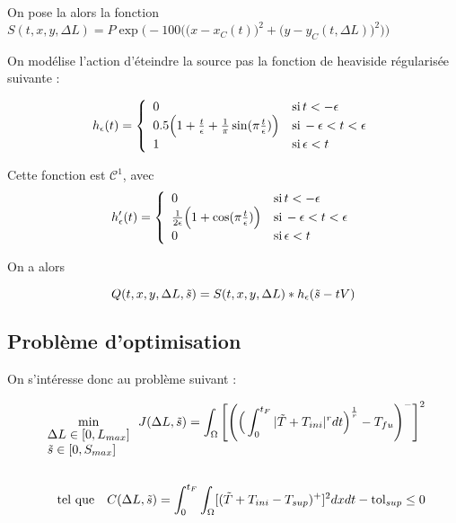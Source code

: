 \documentclass[11pt,a4paper]{article}
\begin{document}
On pose la alors la fonction $S(t,x,y,\Delta L)=P\exp\bigg(-100\Big(\big(x-x_C(t)\big)^2+\big(y-y_C(t,\Delta L)\big)^2\Big)\bigg)$
  
  On modélise l'action d'éteindre la source pas la fonction de heaviside régularisée suivante :

\begin{equation*}
h_{\epsilon}(t)=\left\{
\begin{array}{ll}
0 & \textrm{si\,} t < -\epsilon \\
0.5\Big(1+\frac{t}{\epsilon}+\frac{1}{\pi} \sin(\pi \frac{t}{\epsilon})\Big) & \textrm{si\,}-\epsilon < t<\epsilon \\
1 & \textrm{si\,}  \epsilon<t \\
\end{array}
\right.
\end{equation*}

Cette fonction est $\mathcal{C}^1$, avec 
\begin{equation*}
h'_{\epsilon}(t)=\left\{
\begin{array}{ll}
0 & \textrm{si\,} t < -\epsilon \\
\frac{1}{2\epsilon}\Big(1+\cos(\pi \frac{t}{\epsilon})\Big) & \textrm{si\,}-\epsilon < t<\epsilon \\
0& \textrm{si\,}  \epsilon<t \\
\end{array}
\right.
\end{equation*}

On a alors 

\begin{equation}
Q(t,x,y,\Delta L,\tilde{s})=S(t,x,y,\Delta L)*h_{\epsilon}(\tilde{s}-tV)
\end{equation}  


\subsection*{Problème d'optimisation}

On s'intéresse donc au problème suivant :

\begin{equation*}
\label{eq:pbOptim}
\begin{aligned}
\min_{\begin{array}{l}
	\Delta L\in[0,L_{max}] \\
	\tilde{s}\in [0,S_{max}]
	\end{array}} J(\Delta L,\tilde{s})=\int_{\Omega}\Bigg[\Bigg(\Big(\int_{0}^{t_F}|\tilde{T}+T_{ini}|^rdt\Big)^{\frac{1}{r}}-T_{fu}\Bigg)^-\Bigg]^2 \\
\\
\textrm{tel\,\,que\quad} C(\Delta L,\tilde{s})=\int_{0}^{t_F}\int_{\Omega}[(\tilde{T}+T_{ini}-T_{sup})^+]^2dxdt-\textrm{tol}_{sup}\leq 0
\end{aligned}
\end{equation*}
\end{document}
